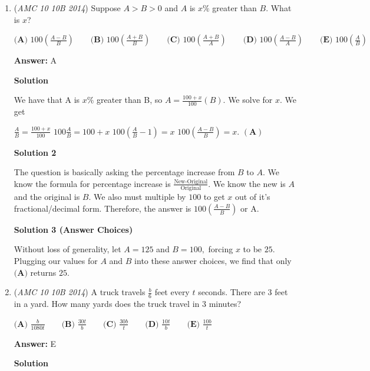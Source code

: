 \begin{enumerate}
	\item (\textit{AMC 10 10B 2014}) Suppose $A>B>0$ and $A$ is $x\%$ greater than $B$. What is $x$?


 $\textbf {(A) } 100\left(\frac{A-B}{B}\right) \qquad \textbf {(B) } 100\left(\frac{A+B}{B}\right) \qquad \textbf {(C) } 100\left(\frac{A+B}{A}\right)\qquad \textbf {(D) } 100\left(\frac{A-B}{A}\right) \qquad \textbf {(E) } 100\left(\frac{A}{B}\right)$

 \textbf{Answer: }A



\textbf{Solution}

We have that A is $x\%$ greater than B, so $A=\frac{100+x}{100}(B)$. We solve for $x$. We get 

 $\frac{A}{B}=\frac{100+x}{100}$
$100\frac{A}{B}=100+x$
$100\left(\frac{A}{B}-1\right)=x$
$100\left(\frac{A-B}{B}\right)=x$.  $\boxed{\left(\textbf{A}\right)}$




\textbf{Solution 2}

The question is basically asking the percentage increase from $B$ to $A$. We know the formula for percentage increase is $\frac{\text{New-Original}}{\text{Original}}$. We know the new is $A$ and the original is $B$. We also must multiple by $100$ to get $x$ out of it's fractional/decimal form. Therefore, the answer is $100\left(\frac{A-B}{B}\right)$ or $\boxed{\text{A}}$.

 



\textbf{Solution 3 (Answer Choices)}

Without loss of generality, let $A = 125$ and $B = 100,$ forcing $x$ to be $25$. Plugging our values for $A$ and $B$ into these answer choices, we find that only $\boxed{\textbf{(A)}}$ returns $25$.

 


 


	\item (\textit{AMC 10 10B 2014}) A truck travels $\frac{b}{6}$ feet every $t$ seconds. There are $3$ feet in a yard. How many yards does the truck travel in $3$ minutes?


 $\textbf {(A) } \frac{b}{1080t} \qquad \textbf {(B) } \frac{30t}{b} \qquad \textbf {(C) } \frac{30b}{t}\qquad \textbf {(D) } \frac{10t}{b} \qquad \textbf {(E) } \frac{10b}{t}$

 \textbf{Answer: }E



\textbf{Solution}


\end{enumerate}
